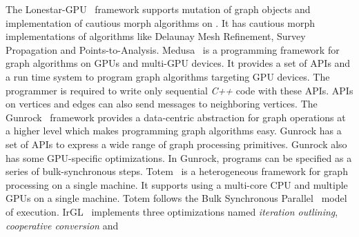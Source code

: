 The Lonestar-GPU~\cite{nasre13:MAG:2517327.2442531} framework supports mutation of graph objects and implementation of cautious morph algorithms on \GPU.
It has cautious morph implementations  of algorithms like  Delaunay Mesh Refinement, Survey Propagation and  Points-to-Analysis. 
 Medusa~\cite{medusa2014} is a  programming framework for graph algorithms on GPUs and multi-GPU devices. 
It provides a set of  APIs and a run time system to program graph algorithms targeting GPU devices.
The programmer is required  to write only  sequential {\it C++} code with these APIs. 
 APIs on vertices and edges can also send messages to neighboring vertices.
The Gunrock~\cite{Wang:2016:GHG:3016078.2851145} framework provides  a data-centric abstraction for graph operations at
a higher level which makes programming  graph algorithms easy.
Gunrock has  a set of  APIs to  express a  wide range of graph processing primitives.
Gunrock also has some  GPU-specific optimizations.
In Gunrock, programs can be specified as a series of bulk-synchronous steps. 
Totem~\cite{Gharaibeh:2012:YOT:2370816.2370866,Gharaibeh:2013:ECG:2535753.2535755} is a heterogeneous framework for graph processing on a single machine.  It supports using a multi-core CPU and multiple GPUs on a single machine.
Totem follows the Bulk Synchronous Parallel~\cite{Valiant:1990:BMP:79173.79181} model of execution.
IrGL~\cite{Pai:2016:CTO:2983990.2984015} implements three optimizations named {\it iteration outlining}, {\it cooperative conversion} and
